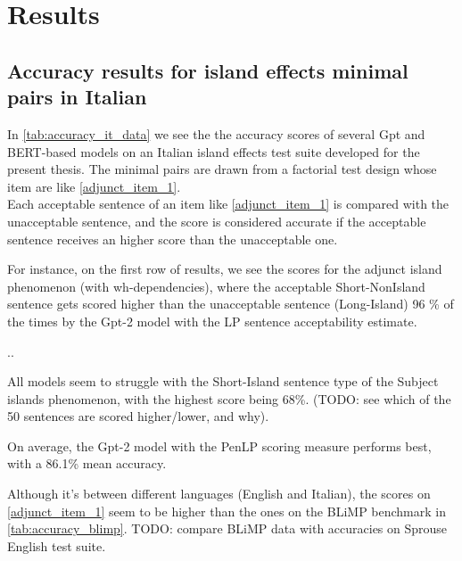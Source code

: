 \chapter{Results}


\section{Accuracy results for island effects minimal pairs in Italian}

In \autoref{tab:accuracy_it_data} we see the the accuracy scores of several Gpt and BERT-based models on an Italian island effects test suite developed for the present thesis. The minimal pairs are drawn from a factorial test design whose item are like \autoref{adjunct_item_1}. 
\\ Each acceptable sentence of an item like \autoref{adjunct_item_1} is compared with the unacceptable sentence, and the score is considered accurate if the acceptable sentence receives an higher score than the unacceptable one.

For instance, on the first row of results, we see the scores for the adjunct island phenomenon (with wh-dependencies), where the acceptable Short-NonIsland sentence gets scored higher than the unacceptable sentence (Long-Island) 96 \% of the times by the Gpt-2 model with the LP sentence acceptability estimate.

..

All models seem to struggle with the Short-Island sentence type of the Subject islands phenomenon, with the highest score being 68\%. (TODO: see which of the 50 sentences are scored higher/lower, and why).

On average, the Gpt-2 model with the PenLP scoring measure performs best, with a 86.1\% mean accuracy.

Although it's between different languages (English and Italian), the scores on \autoref{adjunct_item_1} seem to be higher than the ones on the BLiMP benchmark in \autoref{tab:accuracy_blimp}. TODO: compare BLiMP data with accuracies on Sprouse English test suite.


